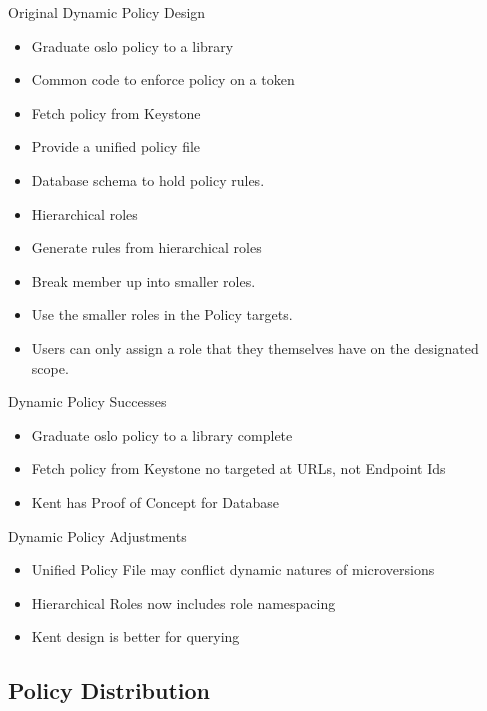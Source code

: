 \documentclass{beamer}
\begin{document}
\begin{frame}{Original Dynamic Policy Design}
  \begin{itemize}
  \item Graduate oslo policy to a library
  \item Common code to enforce policy on a token
  \item Fetch policy from Keystone
  \item Provide a unified policy file
  \item Database schema to hold policy rules.  
  \item Hierarchical roles
  \item Generate rules from hierarchical roles
  \item Break member up into smaller roles.
  \item Use the smaller roles in the Policy targets.
  \item Users can only assign a role that they themselves have on the designated scope.
  \end{itemize}
\end{frame}

\begin{frame}{Dynamic Policy Successes}
  \begin{itemize}
  \item Graduate oslo policy to a library complete
  \item Fetch policy from Keystone no targeted at URLs, not Endpoint Ids
  \item Kent has Proof of Concept for Database
  \end{itemize}
\end{frame}


\begin{frame}{Dynamic Policy Adjustments}
  \begin{itemize}
  \item Unified Policy File may conflict dynamic natures of microversions
  \item Hierarchical Roles now includes role namespacing
  \item Kent design is better for querying
  \end{itemize}
\end{frame}


\subsection {Policy Distribution}
\end{document}
